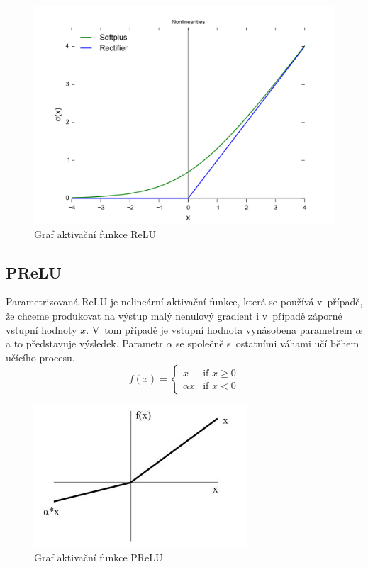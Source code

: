 \begin{figure}[H]
    \centering
    \includegraphics[scale=0.2]{obrazky-figures/ReLU.png}
    \caption{\label{fig:relu}Graf aktivační funkce ReLU}
\end{figure}




\subsection*{PReLU}
Parametrizovaná ReLU je nelineární aktivační funkce, která se používá v~případě, že chceme produkovat na výstup malý nenulový gradient i v~případě záporné vstupní hodnoty $x$. V~tom případě je vstupní hodnota vynásobena parametrem $\alpha$ a to představuje výsledek. Parametr $\alpha$ se společně s~ostatními váhami učí během učícího procesu.
\begin{equation}
  f(x) =
  \begin{cases}
    x & \text{if } x \geq 0 \\
    {\alpha}x & \text{if } x < 0
  \end{cases}
\end{equation}

\begin{figure}[H]
    \centering
    \includegraphics[scale=1.4]{obrazky-figures/prelu.jpg}
    \caption{\label{fig:prelu}Graf aktivační funkce PReLU}
\end{figure}


